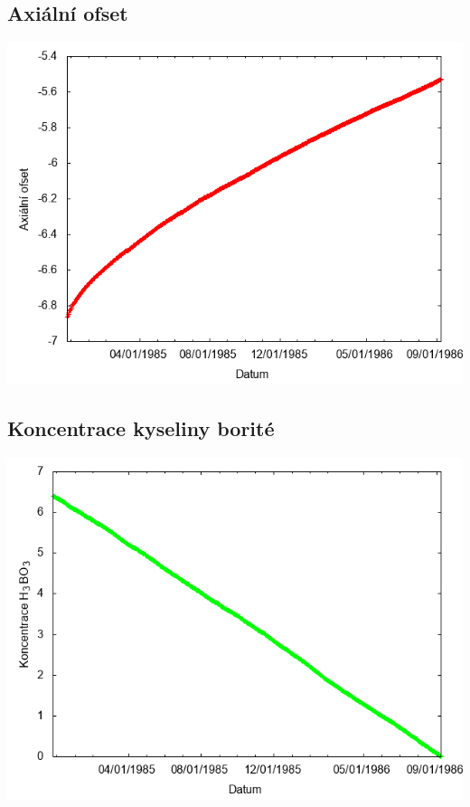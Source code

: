 \documentclass[a4paper,twoside,11pt]{article}
\begin{document}
\subsection*{Axiální ofset}
\begin{center}
\includegraphics[width=.8\textwidth]{graphs/Disneyland_17_ao.png}
\end{center}

\subsection*{Koncentrace kyseliny borité}
\begin{center}
\includegraphics[width=.8\textwidth]{graphs/Disneyland_17_bc.png}
\end{center}
\end{document}
